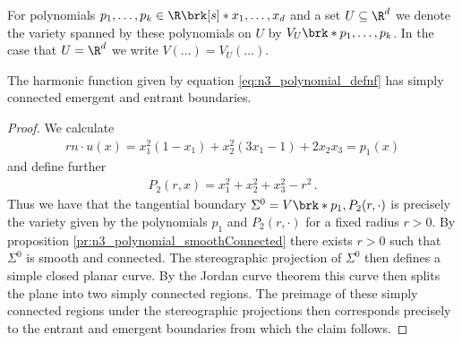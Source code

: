 For polynomials $p_1,\dots,p_k\in\R\brk[s]*{x_1,\dots,x_d}$ and a set $U\subseteq\R^d$ we denote the
variety spanned by these polynomials on $U$ by $V_U\brk*{p_1,\dots,p_k}$.
In the case that $U=\R^d$ we write $V(\dots)=V_U(\dots)$.
\begin{proposition}
  The harmonic function given by equation \eqref{eq:n3_polynomial_defnf} has simply connected emergent and entrant boundaries.
\end{proposition}
\begin{proof}
  We calculate
  \begin{align*}
    rn\cdot u(x) = x_1^2(1-x_1)+x_2^2(3x_1-1)+2x_2x_3=p_1(x)
  \end{align*}
  and define further
  \begin{align*}
    P_2(r,x)=x_1^2+x_2^2+x_3^2-r^2\,.
  \end{align*}
  Thus we have that the tangential boundary $\Sigma^0=V\brk*{p_1,P_2(r,\cdot)}$
  is precisely the variety given by the polynomials $p_1$ and $P_2(r,\cdot)$ for a
  fixed radius $r>0$.
  By proposition \ref{pr:n3_polynomial_smoothConnected} there exists $r>0$ such that
  $\Sigma^0$  is smooth and connected.
  The stereographic projection
  of $\Sigma^0$ then defines a simple closed planar curve.
  By the Jordan curve theorem this curve then splits the plane into two simply connected regions.
  The preimage of these simply connected regions under the stereographic projections then corresponds
  precisely to the entrant and emergent boundaries from which the claim follows.



\end{proof}

